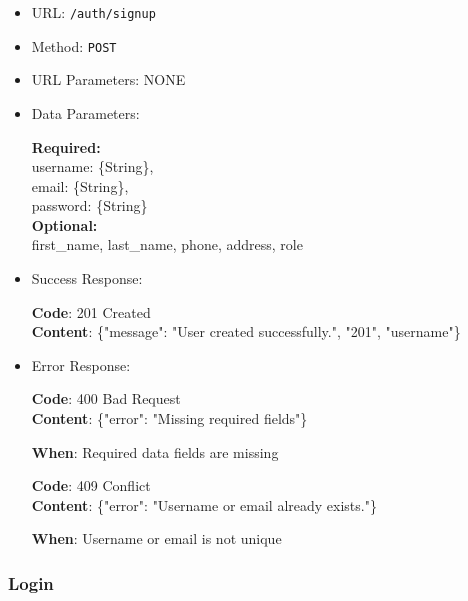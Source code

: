 \begin{itemize}
    \item URL: \texttt{/auth/signup}
    \item Method: \texttt{POST}
    \item URL Parameters: NONE
    \item Data Parameters:

    \textbf{Required:} \\
    username: \{String\}, \\
    email: \{String\}, \\
    password: \{String\} \\
    
    \textbf{Optional:} \\
    first\_name, last\_name, phone, address, role

    \item Success Response: \newline

    \textbf{Code}: 201 Created \\
    \textbf{Content}: \{"message": "User created successfully.", "201", "username"\}

    \item Error Response: \newline

    \textbf{Code}: 400 Bad Request \\
    \textbf{Content}: \{"error": "Missing required fields"\}

    \textbf{When}: Required data fields are missing \newline

    \textbf{Code}: 409 Conflict \\
    \textbf{Content}: \{"error": "Username or email already exists."\}

    \textbf{When}: Username or email is not unique
\end{itemize}

\subsubsection*{Login}

